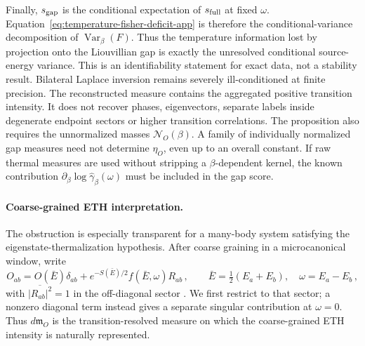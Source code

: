 \documentclass[a4paper,11pt]{article}
\def\dd{d}%
\def\ee{e}%
\theoremstyle{definition}
\theoremstyle{remark}
\newcommand{\dd}{\mathrm d}
\newcommand{\ee}{\mathrm e}
\begin{document}
Finally, $s_{\rm gap}$ is the conditional expectation of $s_{\rm full}$ at fixed $\omega$.
Equation~\eqref{eq:temperature-fisher-deficit-app} is therefore the conditional-variance
decomposition of $\operatorname{Var}_\beta(F)$.  Thus the temperature information lost by
projection onto the Liouvillian gap is exactly the unresolved conditional source-energy variance.
This is an identifiability statement for exact data, not a stability result.  Bilateral Laplace
inversion remains severely ill-conditioned at finite precision.  The reconstructed measure
contains the aggregated positive transition intensity.  It does not recover phases, eigenvectors,
separate labels inside degenerate endpoint sectors or higher transition correlations.  The proposition 
also requires the unnormalized masses $\mathcal N_O(\beta)$.  A family of individually normalized
gap measures need not determine $\eta_O$, even up to an overall constant.  If raw thermal measures
are used without stripping a $\beta$-dependent kernel, the known contribution
$\partial_\beta\log\widehat\gamma_\beta(\omega)$ must be included in the gap score.

\paragraph{Coarse-grained ETH interpretation.}
The obstruction is especially transparent for a many-body system satisfying the
eigenstate-thermalization hypothesis.  After coarse graining in a microcanonical window, write
\begin{equation}
   O_{ab}=O(\bar E)\delta_{ab}
   +\ee^{-S(\bar E)/2}f(\bar E,\omega)R_{ab}\,,
   \qquad
   \bar E=\tfrac12(E_a+E_b),\quad \omega=E_a-E_b\,,
\end{equation}
with $\overline{|R_{ab}|^2}=1$ in the off-diagonal sector
\cite{Srednicki1999ETH}.  We first restrict to that sector; a nonzero diagonal
term instead gives a separate singular contribution at $\omega=0$.  Thus $\dd\mathfrak m_O$ is the transition-resolved measure
on which the coarse-grained ETH intensity is naturally represented.
\end{document}
